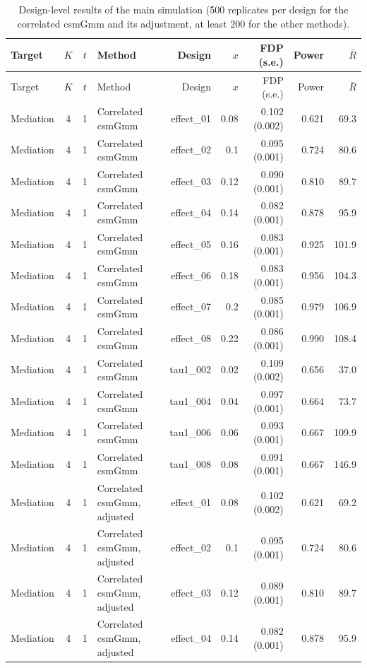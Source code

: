 \begin{longtable}{lcclrrrrr}
\caption{Design-level results of the main simulation (500 replicates per design for the correlated csmGmm and its adjustment, at least 200 for the other methods).}\label{tab:sim-design}\\
\toprule
Target & $K$ & $t$ & Method & Design & $x$ & FDP (s.e.) & Power & $\bar R$\\
\midrule
\endfirsthead
\toprule
Target & $K$ & $t$ & Method & Design & $x$ & FDP (s.e.) & Power & $\bar R$\\
\midrule
\endhead
Mediation & 4 & 1 & Correlated csmGmm & effect\_01 & 0.08 & 0.102 (0.002) & 0.621 & 69.3\\
Mediation & 4 & 1 & Correlated csmGmm & effect\_02 & 0.1 & 0.095 (0.001) & 0.724 & 80.6\\
Mediation & 4 & 1 & Correlated csmGmm & effect\_03 & 0.12 & 0.090 (0.001) & 0.810 & 89.7\\
Mediation & 4 & 1 & Correlated csmGmm & effect\_04 & 0.14 & 0.082 (0.001) & 0.878 & 95.9\\
Mediation & 4 & 1 & Correlated csmGmm & effect\_05 & 0.16 & 0.083 (0.001) & 0.925 & 101.9\\
Mediation & 4 & 1 & Correlated csmGmm & effect\_06 & 0.18 & 0.083 (0.001) & 0.956 & 104.3\\
Mediation & 4 & 1 & Correlated csmGmm & effect\_07 & 0.2 & 0.085 (0.001) & 0.979 & 106.9\\
Mediation & 4 & 1 & Correlated csmGmm & effect\_08 & 0.22 & 0.086 (0.001) & 0.990 & 108.4\\
Mediation & 4 & 1 & Correlated csmGmm & tau1\_002 & 0.02 & 0.109 (0.002) & 0.656 & 37.0\\
Mediation & 4 & 1 & Correlated csmGmm & tau1\_004 & 0.04 & 0.097 (0.001) & 0.664 & 73.7\\
Mediation & 4 & 1 & Correlated csmGmm & tau1\_006 & 0.06 & 0.093 (0.001) & 0.667 & 109.9\\
Mediation & 4 & 1 & Correlated csmGmm & tau1\_008 & 0.08 & 0.091 (0.001) & 0.667 & 146.9\\
Mediation & 4 & 1 & Correlated csmGmm, adjusted & effect\_01 & 0.08 & 0.102 (0.002) & 0.621 & 69.2\\
Mediation & 4 & 1 & Correlated csmGmm, adjusted & effect\_02 & 0.1 & 0.095 (0.001) & 0.724 & 80.6\\
Mediation & 4 & 1 & Correlated csmGmm, adjusted & effect\_03 & 0.12 & 0.089 (0.001) & 0.810 & 89.7\\
Mediation & 4 & 1 & Correlated csmGmm, adjusted & effect\_04 & 0.14 & 0.082 (0.001) & 0.878 & 95.9\\

\end{longtable}
